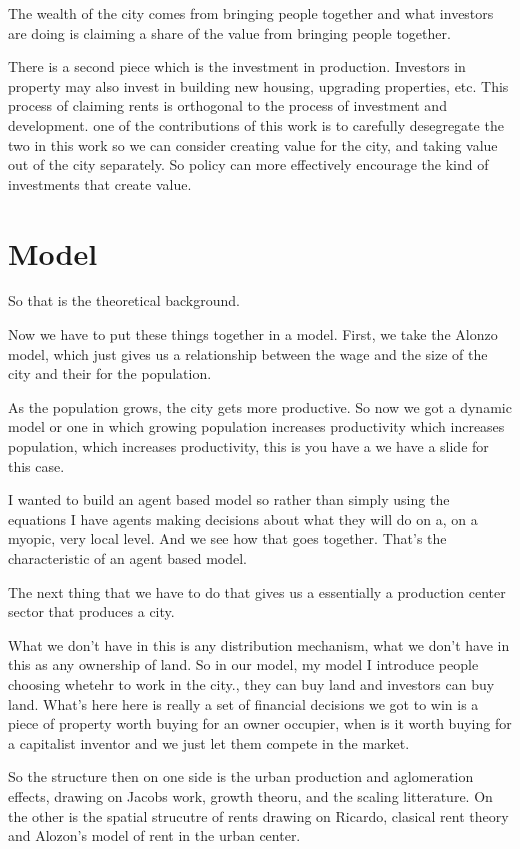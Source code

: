 \documentclass[]{article}
\begin{document}
The wealth of the city comes from bringing people together and  what investors are doing is  claiming a share of the value from bringing people together. 

There is a second piece which is the investment in production. Investors in property may also invest in building new housing, upgrading properties, etc. 
This process of claiming rents  is orthogonal to the process of investment and development.
one of the contributions of this work is to carefully desegregate the two in this work so we can consider creating value for the city, and taking value out of the city separately. 
So policy can more effectively encourage the kind of investments that create value. 


\section{Model}

So that is the theoretical background.

Now we have to put these things together in a model.
First, we take the Alonzo model, which just gives us a relationship between the wage and the size of the city and their for the population.

As the population grows, the city gets more productive. So now we got a dynamic model or one in which growing population increases productivity which increases population, which increases productivity, this is you have a we have a slide for this case.

I wanted to build an agent based model so rather than simply using the equations I have agents making decisions about what they will do on a, on a myopic, very local level. And we see how that goes together. That's the characteristic of an agent based model.

The next thing that we have to do that gives us a essentially a production center sector that produces a city.

What we don't have in this is any distribution mechanism, what we don't have in this as any ownership of land. So in our model, my model I introduce people choosing whetehr to work in the city., they can buy  land and investors can buy land. What's here here is really a set of financial decisions we got to win is a piece of property worth buying for an owner occupier, when is it worth buying for a capitalist inventor and we just let them compete in the market.

So the structure then on one side is the urban production and aglomeration effects, drawing on Jacobs work, growth theoru, and the scaling litterature. On the other is the spatial strucutre of rents drawing on Ricardo, clasical rent theory and Alozon's model of rent in the urban center. 
\end{document}
